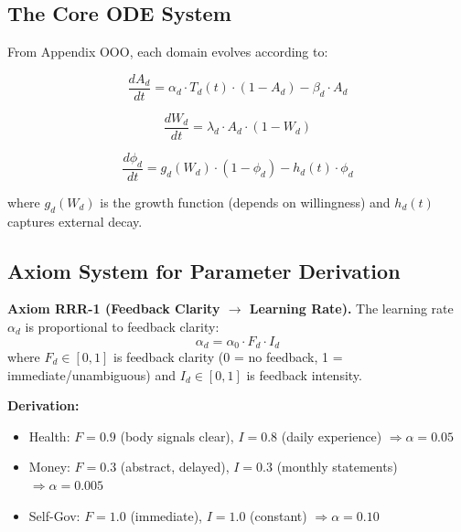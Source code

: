 \subsection{The Core ODE System}

From Appendix OOO, each domain evolves according to:

\begin{equation}
\frac{dA_d}{dt} = \alpha_d \cdot T_d(t) \cdot (1 - A_d) - \beta_d \cdot A_d
\label{eq:rrr-awareness}
\end{equation}

\begin{equation}
\frac{dW_d}{dt} = \lambda_d \cdot A_d \cdot (1 - W_d)
\label{eq:rrr-willingness}
\end{equation}

\begin{equation}
\frac{d\phi_d}{dt} = g_d(W_d) \cdot (1 - \phi_d) - h_d(t) \cdot \phi_d
\label{eq:rrr-phase}
\end{equation}

where $g_d(W_d)$ is the growth function (depends on willingness) and $h_d(t)$ captures external decay.

\subsection{Axiom System for Parameter Derivation}

\begin{tcolorbox}[colback=red!5!white, colframe=red!75!black, title=Axiom RRR-1: Feedback Clarity]
\textbf{Axiom RRR-1 (Feedback Clarity $\rightarrow$ Learning Rate).}
The learning rate $\alpha_d$ is proportional to feedback clarity:
\begin{equation}
\alpha_d = \alpha_0 \cdot F_d \cdot I_d
\end{equation}
where $F_d \in [0,1]$ is feedback clarity (0 = no feedback, 1 = immediate/unambiguous)
and $I_d \in [0,1]$ is feedback intensity.

\textbf{Derivation:}
\begin{itemize}[nosep]
\item Health: $F = 0.9$ (body signals clear), $I = 0.8$ (daily experience) $\Rightarrow \alpha = 0.05$
\item Money: $F = 0.3$ (abstract, delayed), $I = 0.3$ (monthly statements) $\Rightarrow \alpha = 0.005$
\item Self-Gov: $F = 1.0$ (immediate), $I = 1.0$ (constant) $\Rightarrow \alpha = 0.10$
\end{itemize}
\end{tcolorbox}

